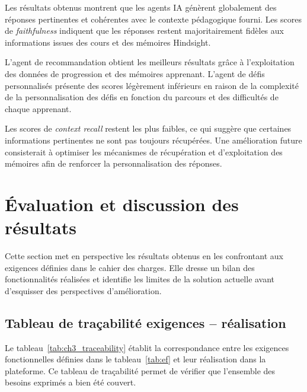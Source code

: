 Les résultats obtenus montrent que les agents IA génèrent globalement des réponses pertinentes et cohérentes avec le contexte pédagogique fourni. Les scores de \textit{faithfulness} indiquent que les réponses restent majoritairement fidèles aux informations issues des cours et des mémoires Hindsight.

L'agent de recommandation obtient les meilleurs résultats grâce à l'exploitation des données de progression et des mémoires apprenant. L'agent de défis personnalisés présente des scores légèrement inférieurs en raison de la complexité de la personnalisation des défis en fonction du parcours et des difficultés de chaque apprenant.

Les scores de \textit{context recall} restent les plus faibles, ce qui suggère que certaines informations pertinentes ne sont pas toujours récupérées. Une amélioration future consisterait à optimiser les mécanismes de récupération et d'exploitation des mémoires afin de renforcer la personnalisation des réponses.

\section{Évaluation et discussion des résultats}

Cette section met en perspective les résultats obtenus en les confrontant aux exigences définies dans le cahier des charges. Elle dresse un bilan des fonctionnalités réalisées et identifie les limites de la solution actuelle avant d'esquisser des perspectives d'amélioration.

\subsection{Tableau de traçabilité exigences -- réalisation}

Le tableau~\ref{tab:ch3_traceability} établit la correspondance entre les exigences fonctionnelles définies dans le tableau~\ref{tab:ef} et leur réalisation dans la plateforme. Ce tableau de traçabilité permet de vérifier que l'ensemble des besoins exprimés a bien été couvert.


